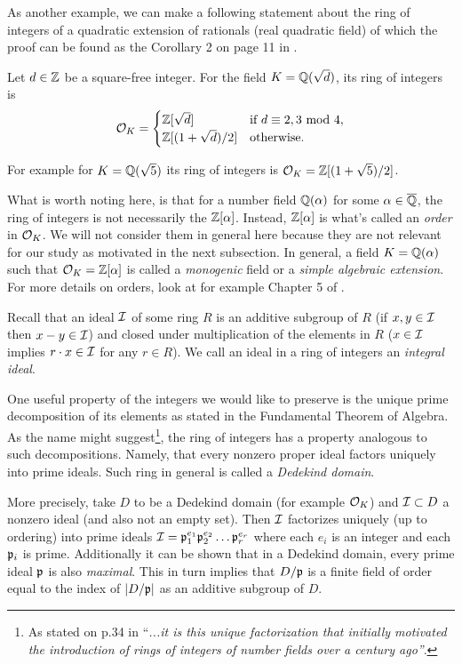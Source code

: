 As another example, we can make a following statement about the ring of integers of a quadratic extension of rationals (real quadratic field) of which the proof can be found as the Corollary 2 on page 11 in \cite{algebra}.
\begin{proposition}
     Let $d \in \mathbb{Z}$ be a square-free integer. For the field $K = \mathbb{Q}(\sqrt{d})$, its ring of integers is 
     \[ \mathcal{O}_K = 
	 \begin{cases} 
	     \mathbb{Z}[\sqrt{d}] & \text{if $d \equiv 2, 3 \text{ mod } 4$}, \\
	     \mathbb{Z}[(1 + \sqrt{d})/2] & \text{otherwise}.
     	 \end{cases}
     \]
\end{proposition}

For example for $K = \mathbb{Q}(\sqrt{5})$ its ring of integers is $\mathcal{O}_K = \mathbb{Z}[(1 + \sqrt{5})/2]$. 
\begin{remark}\label{monogenic}
	What is worth noting here, is that for a number field $\mathbb{Q}(\alpha)$ for some $\alpha \in \overline{\mathbb{Q}}$, the ring of integers is not necessarily the $\mathbb{Z}[\alpha]$. Instead, $\mathbb{Z}[\alpha]$ is what's called an \textit{order} in $\mathcal{O}_K$. We will not consider them in general here because they are not relevant for our study as motivated in the next subsection. In general, a field $K = \mathbb{Q}(\alpha)$ such that $\mathcal{O}_K = \mathbb{Z}[\alpha]$ is called a \textit{monogenic} field or a \textit{simple algebraic extension}. For more details on orders, look at for example Chapter 5 of \cite{stein}.
\end{remark}

Recall that an ideal $\mathcal{I}$ of some ring $R$ is an additive subgroup of $R$ (if $x,y \in \mathcal{I}$ then $x-y \in \mathcal{I}$) and closed under multiplication of the elements in $R$ ($x \in \mathcal{I}$ implies $r \cdot x \in \mathcal{I}$ for any $r \in R$). We call an ideal in a ring of integers an \textit{integral ideal}.

One useful property of the integers we would like to preserve is the unique prime decomposition of its elements as stated in the Fundamental Theorem of Algebra. As the name might suggest\footnote{As stated on p.34 in \cite{stein} ``\textit{...it is this unique factorization that initially motivated the introduction of rings of integers of number fields over a century ago''}.}, the ring of integers has a property analogous to such decompositions. Namely, that every nonzero proper ideal factors uniquely into prime ideals. Such ring in general is called a \textit{Dedekind domain}.

More precisely, take $D$ to be a Dedekind domain (for example $\mathcal{O}_K$) and $\mathcal{I} \subset D$ a nonzero ideal (and also not an empty set). Then $\mathcal{I}$ factorizes uniquely (up to ordering) into prime ideals $\mathcal{I} = \mathfrak{p}_1^{e_1} \mathfrak{p}_2^{e_2} \ldots \mathfrak{p}_r^{e_r}$ where each $e_i$ is an integer and each $\mathfrak{p}_i$ is prime. Additionally it can be shown that in a Dedekind domain, every prime ideal $\mathfrak{p}$ is also \textit{maximal}. This in turn implies that $D/\mathfrak{p}$ is a finite field of order equal to the index of $|D /\mathfrak{p}|$ as an additive subgroup of $D$.

